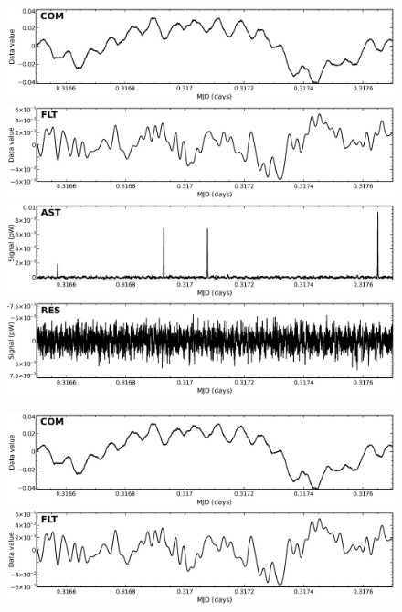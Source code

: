 \documentclass[twoside,11pt]{article}
\newenvironment{latexonly}{}{}
\renewcommand{\_}{\texttt{\symbol{95}}}
\begin{document}
\begin{figure}
\begin{center}
\begin{latexonly}
  \includegraphics[width=\linewidth]{sc21_com.eps} \\
  \includegraphics[width=\linewidth]{sc21_flt.eps} \\
  \includegraphics[width=\linewidth]{sc21_ast.eps} \\
  \includegraphics[width=\linewidth]{sc21_res.eps} \\
\end{latexonly}
\begin{htmlonly}
  \includegraphics[width=136mm]{sc21_com.eps} \\
  \includegraphics[width=136mm]{sc21_flt.eps} \\

\end{htmlonly}
\end{center}
\end{figure}
\end{document}
